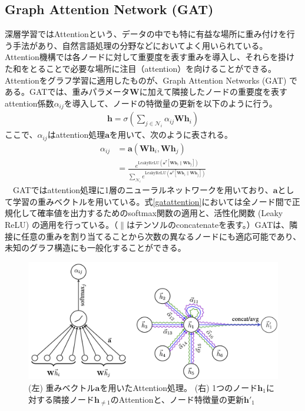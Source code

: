 \subsection{Graph Attention Network (GAT)}
\label{GATexplain}
深層学習ではAttentionという、データの中でも特に有益な場所に重み付けを行う手法があり、自然言語処理の分野などにおいてよく用いられている。Attention機構では各ノードに対して重要度を表す重みを導入し、それらを掛けた和をとることで必要な場所に注目（attention）を向けることができる。Attentionをグラフ学習に適用したものが、Graph Attention Networks (GAT) \cite{gat} である。GATでは、重みパラメータ$\bm{W}$に加えて隣接したノードの重要度を表すattention係数$\alpha_{ij}$を導入して、ノードの特徴量の更新を以下のように行う。
\begin{align}
\bm{h} = \sigma (\sum_{j \in \mathcal{N}_i} \alpha_{ij} \bm{W} \bm{h}_i )
\end{align}
ここで、$\alpha_{ij}$はattention処理$\bm{a}$を用いて、次のように表される。
\begin{align}
\alpha_{ij} &= \bm{a}(\bm{W}\bm{h}_i, \bm{W}\bm{h}_j)\\
 &= \frac{e^{\mathrm{LeakyReLU}(\bm{a}^T [ \bm{W}\bm{h}_i \parallel \bm{W}\bm{h}_j ])}}{\sum_{\mathcal{N}_i} e^{\mathrm{LeakyReLU}(\bm{a}^T [ \bm{W}\bm{h}_i \parallel  \bm{W}\bm{h}_j ])}}
\label{gatattention}
\end{align}
　GATではattention処理に1層のニューラルネットワークを用いており、$\bm{a}$として学習の重みベクトルを用いている。式\ref{gatattention}においては全ノード間で正規化して確率値を出力するためのsoftmax関数の適用と、活性化関数 (Leaky ReLU) の適用を行っている。（$\parallel$はテンソルのconcatenateを表す。）GATは、隣接に任意の重みを割り当てることから次数の異なるノードにも適応可能であり、未知のグラフ構造にも一般化することができる。
\begin{figure}[H]
	\begin{center}
 \includegraphics[keepaspectratio, scale=0.25]
 	{Figure/Deeplearning/gat.png}
 		\caption{ (左) 重みベクトル$\bm{a}$を用いたAttention処理。 (右) 1つのノード$\bm{h}_1$に対する隣接ノード$\bm{h}_{\neq 1}$のAttentionと、ノード特徴量の更新$\bm{h'}_1$}
	\end{center}
\end{figure}